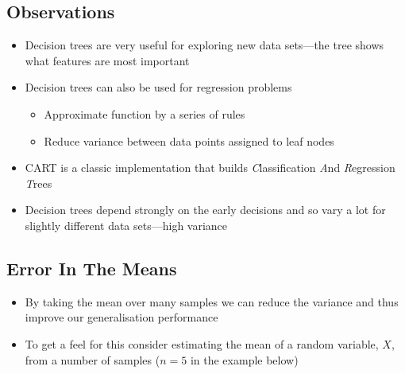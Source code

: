 
\begin{slide}
\section{Observations}

\begin{PauseHighLight}
  \begin{itemize}
  \item Decision trees are very useful for exploring new data
    sets\pause---the tree shows what features are most
    important\pause
  \item Decision trees can also be used for regression problems\pause
    \begin{itemize}
    \item Approximate function by a series of rules\pause
    \item Reduce variance between data points assigned to leaf
      nodes\pause
    \end{itemize}
  \item CART is a classic implementation that builds
    \emph{C}lassification \emph{A}nd \emph{R}egression
    \emph{T}rees\pause
  \item Decision trees depend strongly on the early decisions and so
    vary a lot for slightly different data sets\pause---high variance\pauseb
  \end{itemize}
\end{PauseHighLight}

\end{slide}

\Outline %


\begin{slide}
  \section[-2]{Error In The Means}
  \pb
  \begin{itemize}
  \item By taking the mean over many samples we can reduce the
    variance and thus improve our generalisation performance\pauseh
  \item To get a feel for this consider estimating the mean of a
    random variable, $X$, from a number of samples ($n=5$ in the
    example below)\pauseh    
  \end{itemize}
    \begin{center}
      \pause
    \end{center}
\end{slide}

